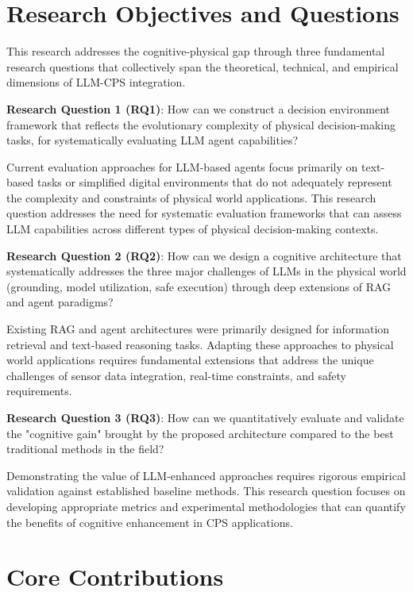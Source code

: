 \section{Research Objectives and Questions}

This research addresses the cognitive-physical gap through three fundamental research questions that collectively span the theoretical, technical, and empirical dimensions of LLM-CPS integration.

\textbf{Research Question 1 (RQ1)}: How can we construct a decision environment framework that reflects the evolutionary complexity of physical decision-making tasks, for systematically evaluating LLM agent capabilities?

Current evaluation approaches for LLM-based agents focus primarily on text-based tasks or simplified digital environments that do not adequately represent the complexity and constraints of physical world applications. This research question addresses the need for systematic evaluation frameworks that can assess LLM capabilities across different types of physical decision-making contexts.

\textbf{Research Question 2 (RQ2)}: How can we design a cognitive architecture that systematically addresses the three major challenges of LLMs in the physical world (grounding, model utilization, safe execution) through deep extensions of RAG and agent paradigms?

Existing RAG and agent architectures were primarily designed for information retrieval and text-based reasoning tasks. Adapting these approaches to physical world applications requires fundamental extensions that address the unique challenges of sensor data integration, real-time constraints, and safety requirements.

\textbf{Research Question 3 (RQ3)}: How can we quantitatively evaluate and validate the "cognitive gain" brought by the proposed architecture compared to the best traditional methods in the field?

Demonstrating the value of LLM-enhanced approaches requires rigorous empirical validation against established baseline methods. This research question focuses on developing appropriate metrics and experimental methodologies that can quantify the benefits of cognitive enhancement in CPS applications.

\section{Core Contributions}

